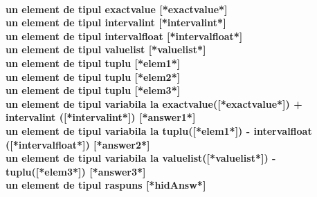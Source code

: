 \documentclass{exam}
\begin{document}
\paragraph{
un element de tipul exactvalue [*exactvalue*]\\
un element de tipul intervalint [*intervalint*] \\
un element de tipul intervalfloat [*intervalfloat*]\\
un element de tipul valuelist [*valuelist*]\\
un element de tipul tuplu [*elem1*]\\
un element de tipul tuplu [*elem2*]\\
un element de tipul tuplu [*elem3*]\\
un element de tipul variabila la exactvalue([*exactvalue*]) + intervalint ([*intervalint*]) [*answer1*]\\
un element de tipul variabila la tuplu([*elem1*]) - intervalfloat ([*intervalfloat*]) [*answer2*]\\
un element de tipul variabila la valuelist([*valuelist*]) - tuplu([*elem3*]) [*answer3*]\\
un element de tipul raspuns [*hidAnsw*]\\
}
\end{document}
